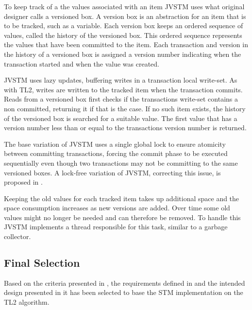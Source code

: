 To keep track of a the values associated with an item JVSTM uses what original designer calls a versioned box\cite[p. 63]{cachopo2007development}. A version box is an abstraction for an item that is to be tracked, such as a variable. Each version box keeps an ordered sequence of values, called the history of the versioned box. This ordered sequence represents the values that have been committed to the item. Each transaction and version in the history of a versioned box is assigned a version number indicating when the transaction started and when the value was created.

JVSTM uses lazy updates, buffering writes in a transaction local write-set\cite[p. 64]{cachopo2007development}. As with TL2, writes are written to the tracked item when the transaction commits. Reads from a versioned box first checks if the transactions write-set contains a non committed, returning it if that is the case\cite[p. 64]{cachopo2007development}. If no such item exists, the history of the versioned box is searched for a suitable value. The first value that has a version number less than or equal to the transactions version number is returned\cite[p. 64]{cachopo2007development}.

The base variation of JVSTM uses a single global lock to ensure atomicity between committing transactions\cite[p. 70]{cachopo2007development}, forcing the commit phase to be executed sequentially even though two transactions may not be committing to the same versioned boxes. A lock-free variation of JVSTM, correcting this issue, is proposed in \cite{fernandes2011lock}.

Keeping the old values for each tracked item takes up additional space and the space consumption increases as new versions are added. Over time some old values might no longer be needed and can therefore be removed. To handle this JVSTM implements a thread responsible for this task\cite[p. 70]{cachopo2007development}\cite[p. 88]{cachopo2007development}, similar to a garbage collector\cite[p. 472]{fischer2009crafting}.

\subsection{Final Selection}
Based on the criteria presented in , the requirements defined in  and the intended design presented in  it has been selected to base the \ac{STM} implementation on the TL2 algorithm. 

